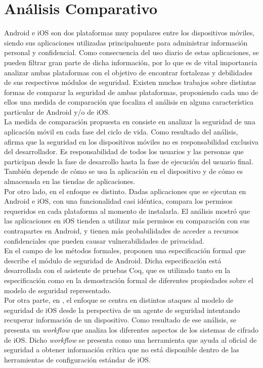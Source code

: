 \chapter{Análisis Comparativo}
Android e iOS son dos plataformas muy populares entre los dispositivos móviles, siendo sus aplicaciones utilizadas principalmente para administrar información personal y confidencial. Como consecuencia del uso diario de estas aplicaciones, se pueden filtrar     gran parte de dicha información, por lo que es de vital importancia analizar ambas plataformas con el objetivo de encontrar fortalezas y debilidades de sus respectivos módulos de seguridad. Existen muchos trabajos sobre distintas formas de comparar la seguridad de ambas plataformas, proponiendo cada uno de ellos una medida de comparación que focaliza el análisis en alguna característica particular de Android y/o de iOS.\\

La medida de comparación propuesta en \cite{YA2014} consiste en analizar la seguridad de una aplicación móvil en cada fase del ciclo de vida. Como resultado del análisis, afirma que la seguridad en los dispositivos móviles no es responsabilidad exclusiva del desarrollador. Es responsabilidad de todos los usuarios y las personas que participan desde la fase de desarrollo hasta la fase de ejecución del usuario final. También depende de cómo se usa la aplicación en el dispositivo y de cómo es almacenada en las tiendas de aplicaciones.\\

Por otro lado, en \cite{HYGZD13} el enfoque es distinto. Dadas aplicaciones que se ejecutan en Android e iOS, con una funcionalidad casi idéntica, compara los permisos requeridos en cada plataforma al momento de instalarla. El análisis mostró que las aplicaciones en iOS tienden a utilizar más permisos en comparación con sus contrapartes en Android, y tienen más probabilidades de acceder a recursos confidenciales que pueden causar vulnerabilidades de privacidad.\\

En el campo de los métodos formales, \cite{Gor16, BCLR15, Rom14} proponen una especificación formal que describe el módulo de seguridad de Android. Dicha especificación está desarrollada con el asistente de pruebas Coq, que es utilizado tanto en la especificación como en la demostración formal de diferentes propiedades sobre el modelo de seguridad representado.\\

Por otra parte, en \cite{TZSH13}, el enfoque se centra en distintos ataques al modelo de seguridad de iOS desde la perspectiva de un agente de seguridad intentando recuperar información de un dispositivo. Como resultado de ese análisis, se presenta un \emph{workflow} que analiza los diferentes aspectos de los sistemas de cifrado de iOS. Dicho \emph{workflow} se presenta como una herramienta que ayuda al oficial de seguridad a obtener información crítica que no está disponible dentro de las herramientas de configuración estándar de iOS.\\

